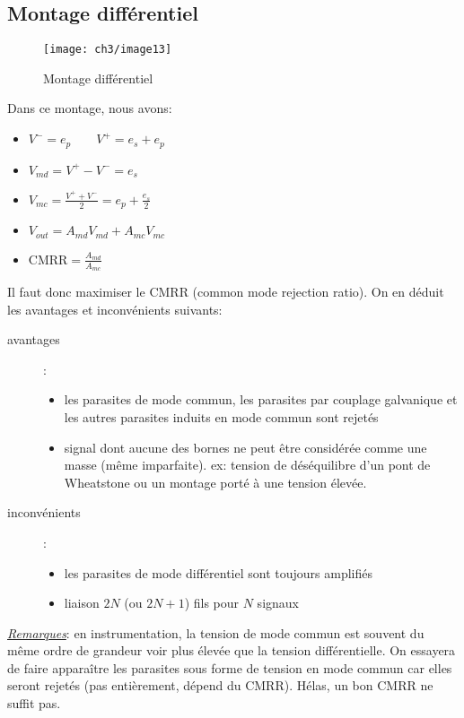 \subsection{Montage différentiel}
\begin{figure}[H] 
	\centering 
	\texttt{[image: ch3/image13]} 
	\caption{Montage différentiel} 
\end{figure}
Dans ce montage, nous avons:
\begin{itemize}
		\item { \(V^-=e_p\qquad V^+=e_s+e_p\)} 
		\item { \(V_{md} = V^+-V^-=e_s\)} 
		\item { \(V_{mc}=\frac{V^++V^-}{2}=e_p+\frac{e_s}{2}\)} 
		\item { \(V_{out}=A_{md}V_{md}+A_{mc}V_{mc}\)} 
		\item { \(\text{CMRR} = \frac{A_{md}}{A_{mc}}\)} 
\end{itemize}
Il faut donc maximiser le CMRR (common mode rejection ratio). On en déduit les avantages et inconvénients suivants:
\begin{description}
	\item[avantages]:
	\begin{itemize}
		\item les parasites de mode commun, les parasites par couplage galvanique et les autres parasites induits en mode commun sont rejetés
		\item signal dont aucune des bornes ne peut être considérée comme une masse (même imparfaite). ex: tension de déséquilibre d'un pont de Wheatstone ou un montage porté à une tension élevée.
	\end{itemize}
	\item [inconvénients]:
	\begin{itemize}
		\item les parasites de mode différentiel sont toujours amplifiés
		\item liaison \(2N\) (ou \(2N+1\)) fils pour \(N\) signaux
	\end{itemize}
\end{description}
\underline{\textit{Remarques}}: en instrumentation, la tension de mode commun est souvent du même ordre de grandeur  voir plus élevée que la tension différentielle. On essayera de faire apparaître les parasites sous forme de tension en mode commun car elles seront rejetés (pas entièrement, dépend du CMRR). Hélas, un bon CMRR ne suffit pas.
